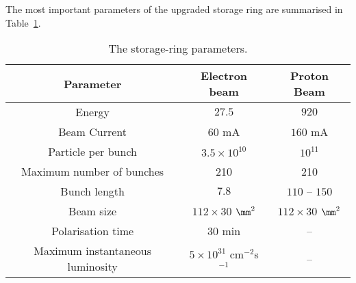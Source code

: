  The most important parameters of the upgraded \hera storage ring are summarised in Table~\ref{tab:HERAParameters}.
\begin{table}[htbp]
	\centering
		\begin{tabular}[h]{|c|c|c|}
			\hline
			Parameter       & Electron beam   & Proton Beam \\
			\hline \hline
			Energy            &     $27.5$ \GeV  & $920$ \GeV \\
			Beam Current  &     $60$ mA       & $160$ mA \\
			Particle per bunch & $3.5\times 10^{10}$ & $10^{11}$ \\
			Maximum number of bunches & 210 & 210 \\
			Bunch length &  $7.8$ \mm & $110$ -- $150$ \mm \\
			Beam size     &  $112\times 30$ $\mm^2$ & $112\times 30$ $\mm^2$ \\
			Polarisation time & $30$ min & -- \\
			Maximum instantaneous luminosity & $5\times 10^{31}$ cm$^{-2}$s$^{-1}$ & -- \\
			\hline
		\end{tabular}
	\caption{The \hera storage-ring parameters.}
	\label{tab:HERAParameters}
\end{table}


